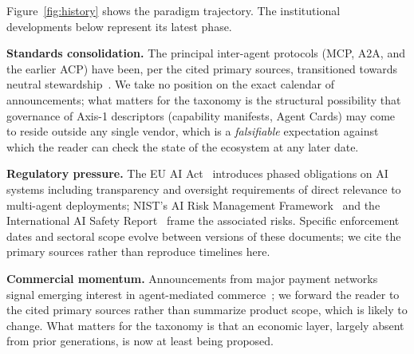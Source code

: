 \documentclass{IEEEcsmag}
\begin{document}
Figure~\ref{fig:history} shows the paradigm trajectory. The institutional developments below represent its latest phase.

\textbf{Standards consolidation.}  The principal inter-agent protocols (MCP, A2A, and the earlier ACP) have been, per the cited primary sources, transitioned towards neutral stewardship~\cite{AAIF_2025, A2A_LinuxFoundation_2025, ACP_Merger_2025}.  We take no position on the exact calendar of announcements; what matters for the taxonomy is the structural possibility that governance of Axis-1 descriptors (capability manifests, Agent Cards) may come to reside outside any single vendor, which is a \emph{falsifiable} expectation against which the reader can check the state of the ecosystem at any later date.

\textbf{Regulatory pressure.}  The EU AI Act~\cite{EUAI_2024} introduces phased obligations on AI systems including transparency and oversight requirements of direct relevance to multi-agent deployments; NIST's AI Risk Management Framework~\cite{NIST_AI_600_2024} and the International AI Safety Report~\cite{AISAFETY_2025} frame the associated risks.  Specific enforcement dates and sectoral scope evolve between versions of these documents; we cite the primary sources rather than reproduce timelines here.

\textbf{Commercial momentum.}  Announcements from major payment networks signal emerging interest in agent-mediated commerce~\cite{Visa_TAP_2025, Mastercard_AgentPay_2025, Stripe_OpenAI_ACP_2025}; we forward the reader to the cited primary sources rather than summarize product scope, which is likely to change.  What matters for the taxonomy is that an economic layer, largely absent from prior generations, is now at least being proposed.
\end{document}
